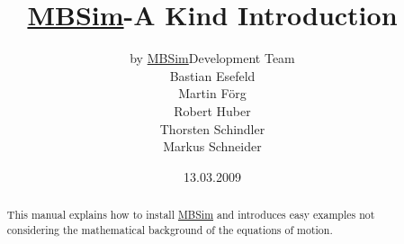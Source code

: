 \documentclass[a4,english]{AMpaper}
\newcommand{\MBSim}{\href{http://mbsim.berlios.de}{\textsf{MBSim}}}
\begin{document}
\title{\MBSim-A Kind Introduction}
\author{by \MBSim Development Team\\
  Bastian Esefeld\\
  Martin F\"org\\
  Robert Huber\\
  Thorsten Schindler\\
  Markus Schneider}
\date{13.03.2009}
\maketitle

\begin{abstract}
  This manual explains how to install \MBSim{} and introduces easy examples not considering the mathematical background of the equations of motion.
\end{abstract}

\noindent\hrulefill
\tableofcontents



%

%
%
%




\end{document}
